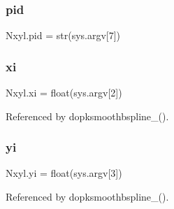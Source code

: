 \subsubsection{\texorpdfstring{pid}{pid}}
{\footnotesize\ttfamily Nxyl.\+pid = str(sys.\+argv\mbox{[}7\mbox{]})}

\mbox{\label{namespaceNxyl_a0316033d0531aeb01568ef43bd76910a}} 
\subsubsection{\texorpdfstring{xi}{xi}}
{\footnotesize\ttfamily Nxyl.\+xi = float(sys.\+argv\mbox{[}2\mbox{]})}



Referenced by dopksmoothbspline\+\_\+().

\mbox{\label{namespaceNxyl_a732fbc06c15422482e259e67d7baf962}} 
\subsubsection{\texorpdfstring{yi}{yi}}
{\footnotesize\ttfamily Nxyl.\+yi = float(sys.\+argv\mbox{[}3\mbox{]})}



Referenced by dopksmoothbspline\+\_\+().

